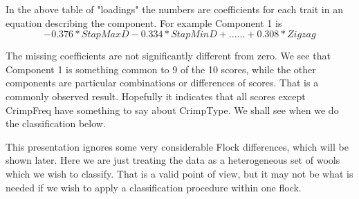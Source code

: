 \documentclass[titlepage]{article}  %
\begin{document}
 In the above table of "loadings" the numbers are coefficients for each trait in an equation describing the component. For example Component 1 is
\begin{displaymath}
-0.376 * StapMaxD - 0.334 * StapMinD + ...... + 0.308 * Zigzag
\end{displaymath}	

The missing coefficients are not significantly different from zero.
We see that Component 1 is something common to 9 of the 10 scores, while the other components are particular combinations or differences of scores. That is a commonly observed result. Hopefully it indicates that all scores except CrimpFreq have something to say about CrimpType. We shall see when we do the classification below.

This presentation ignores some very considerable Flock differences, which will be shown later. Here we are just treating the data as a heterogeneous set of wools which we wish to classify.  That is a valid point of view, but it may not be what is needed if we wish to apply a classification procedure within one flock.
\end{document}

